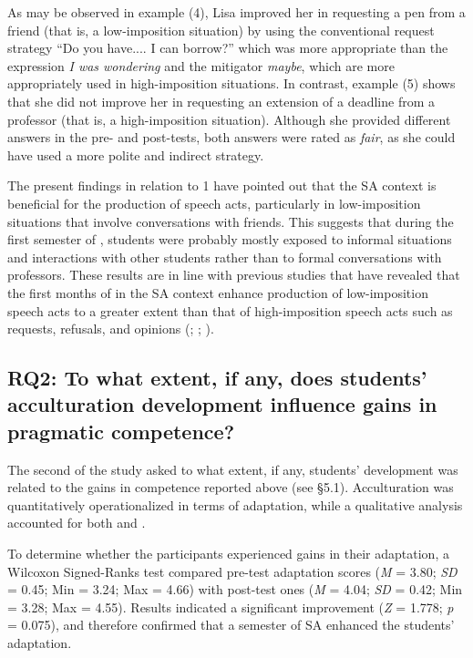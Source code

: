 \documentclass[output=paper]{langsci/langscibook}
\begin{document}
As may be observed in example (4), Lisa improved her  in requesting a pen from a friend (that is, a low-imposition situation) by using the conventional request strategy “Do you have.... I can borrow?”  which was more appropriate than the expression \textit{I was wondering} and the mitigator \textit{maybe}, which are more appropriately used in high-imposition situations. In contrast, example (5) shows that she did not improve her  in requesting an extension of a deadline from a professor (that is, a high-imposition situation). Although she provided different answers in the pre- and post-tests, both answers were rated as \textit{fair}, as she could have used a more polite and indirect strategy.

The present findings in relation to  1 have pointed out that the SA context is beneficial for the production of speech acts, particularly in low-imposition situations that involve conversations with friends. This suggests that during the first semester of , students were probably mostly exposed to informal situations and interactions with other students rather than to formal conversations with professors. These results are in line with previous studies that have revealed that the first months of  in the SA context enhance production of low-imposition speech acts to a greater extent than that of high-imposition speech acts such as requests, refusals, and opinions (\citealt{Taguchi2006}; \citeyear{Taguchi2011}; \citeyear{Taguchi2013}).


\subsection{RQ2: To what extent, if any, does students’ acculturation development influence gains in pragmatic competence?}


The second  of the study asked to what extent, if any, students’  development was related to the gains in  competence reported above (see §5.1). Acculturation was quantitatively operationalized in terms of  adaptation, while a qualitative analysis accounted for both  and . 

To determine whether the participants experienced gains in their  adaptation, a Wilcoxon Signed-Ranks test compared pre-test adaptation scores (\textit{M} = 3.80; \textit{SD} = 0.45; Min = 3.24; Max = 4.66) with post-test ones (\textit{M} = 4.04; \textit{SD} = 0.42; Min = 3.28; Max = 4.55). Results indicated a significant improvement (\textit{Z} = 1.778; \textit{p} = 0.075), and therefore confirmed that a semester of SA enhanced the students’  adaptation. 
\end{document}
